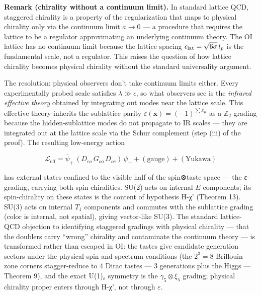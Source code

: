 \documentclass[
]{article}
\begin{document}
\textbf{Remark (chirality without a continuum limit).} In standard
lattice QCD, staggered chirality is a property of the regularization
that maps to physical chirality only via the continuum limit \(a \to 0\)
--- a procedure that requires the lattice to be a regulator
approximating an underlying continuum theory. The OI lattice has no
continuum limit because the lattice spacing
\(\epsilon_{\rm lat} = \sqrt{6\sigma}\,l_p\) is the fundamental scale,
not a regulator. This raises the question of how lattice chirality
becomes physical chirality without the standard universality argument.

The resolution: physical observers don't take continuum limits either.
Every experimentally probed scale satisfies \(\lambda \gg \epsilon\), so
what observers see is the \emph{infrared effective theory} obtained by
integrating out modes near the lattice scale. This effective theory
inherits the sublattice parity
\(\varepsilon(\mathbf{x}) = (-1)^{\sum x_\mu}\) as a \(\mathbb{Z}_2\)
grading because the hidden-sublattice modes do not propagate to IR
scales --- they are integrated out at the lattice scale via the Schur
complement (step (iii) of the proof). The resulting low-energy action

\[\mathcal{L}_{\text{eff}} = \bar\psi_+ \, (D_{eo} \, G_{oo} \, D_{oe}) \, \psi_+ + (\text{gauge}) + (\text{Yukawa})\]

has external states confined to the visible half of the spin⊗taste space
--- the ε-grading, carrying both spin chiralities. SU(2) acts on
internal \(E\) components; its spin-chirality on these states is the
content of hypothesis H-χ' (Theorem 13). SU(3) acts on internal \(T_1\)
components and commutes with the sublattice grading (color is internal,
not spatial), giving vector-like SU(3). The standard lattice-QCD
objection to identifying staggered gradings with physical chirality ---
that the doublers carry ``wrong'' chirality and contaminate the
continuum theory --- is transformed rather than escaped in OI: the
tastes give candidate generation sectors under the physical-spin and
spectrum conditions (the \(2^3 = 8\) Brillouin-zone corners
stagger-reduce to \(4\) Dirac tastes --- \(3\) generations plus the
Higgs --- Theorem 9), and the exact U(1)\(_\varepsilon\) symmetry is the
\(\gamma_5 \otimes \xi_5\) grading; physical chirality proper enters
through H-χ', not through \(\varepsilon\).
\end{document}
